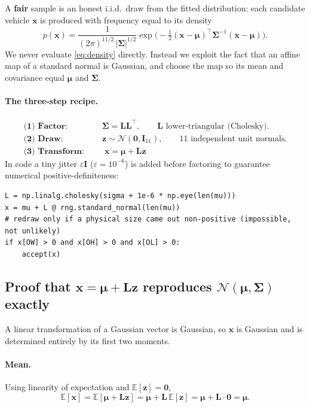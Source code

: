 \documentclass[11pt]{article}
\newcommand{\Norm}{\mathcal{N}}
\newcommand{\bmu}{\boldsymbol{\mu}}
\newcommand{\bSigma}{\boldsymbol{\Sigma}}
\newcommand{\bx}{\mathbf{x}}
\newcommand{\bz}{\mathbf{z}}
\newcommand{\Lmat}{\mathbf{L}}
\newcommand{\Imat}{\mathbf{I}}
\newcommand{\T}{^{\!\top}}
\theoremstyle{definition}
\begin{document}
A \textbf{fair} sample is an honest i.i.d.\ draw from the fitted distribution: each candidate vehicle $\bx$ is produced with frequency equal to its density
\begin{equation}
p(\bx)=\frac{1}{(2\pi)^{11/2}\,|\bSigma|^{1/2}}
        \exp\!\Big(-\tfrac12(\bx-\bmu)\T\bSigma^{-1}(\bx-\bmu)\Big).
\label{eq:density}
\end{equation}
We never evaluate \eqref{eq:density} directly. Instead we exploit the fact that an affine map of a standard normal is Gaussian, and choose the map so its mean and covariance equal $\bmu$ and $\bSigma$.

\paragraph{The three-step recipe.}
\begin{align}
\textbf{(1) Factor: }   \quad & \bSigma=\Lmat\Lmat\T, \qquad \Lmat \text{ lower-triangular (Cholesky).}\\
\textbf{(2) Draw: }     \quad & \bz\sim\Norm(\mathbf{0},\Imat_{11}), \qquad 11 \text{ independent unit normals.}\\
\textbf{(3) Transform: }\quad & \boxed{\;\bx=\bmu+\Lmat\bz\;}
\end{align}
In code a tiny jitter $\varepsilon\Imat$ ($\varepsilon=10^{-6}$) is added before factoring to guarantee numerical positive-definiteness:

\begin{lstlisting}[caption={Fair draw (\texttt{fair\_samples}).}]
L = np.linalg.cholesky(sigma + 1e-6 * np.eye(len(mu)))
x = mu + L @ rng.standard_normal(len(mu))
# redraw only if a physical size came out non-positive (impossible, not unlikely)
if x[OW] > 0 and x[OH] > 0 and x[OL] > 0:
    accept(x)
\end{lstlisting}

\subsection{Proof that \texorpdfstring{$\bx=\bmu+\Lmat\bz$}{x = mu + L z} reproduces \texorpdfstring{$\Norm(\bmu,\bSigma)$}{N(mu,Sigma)} exactly}

A linear transformation of a Gaussian vector is Gaussian, so $\bx$ is Gaussian and is determined entirely by its first two moments.

\paragraph{Mean.} Using linearity of expectation and $\mathbb{E}[\bz]=\mathbf{0}$,
\begin{equation}
\mathbb{E}[\bx]=\mathbb{E}[\bmu+\Lmat\bz]=\bmu+\Lmat\,\mathbb{E}[\bz]=\bmu+\Lmat\cdot\mathbf{0}=\bmu.
\end{equation}
\end{document}
